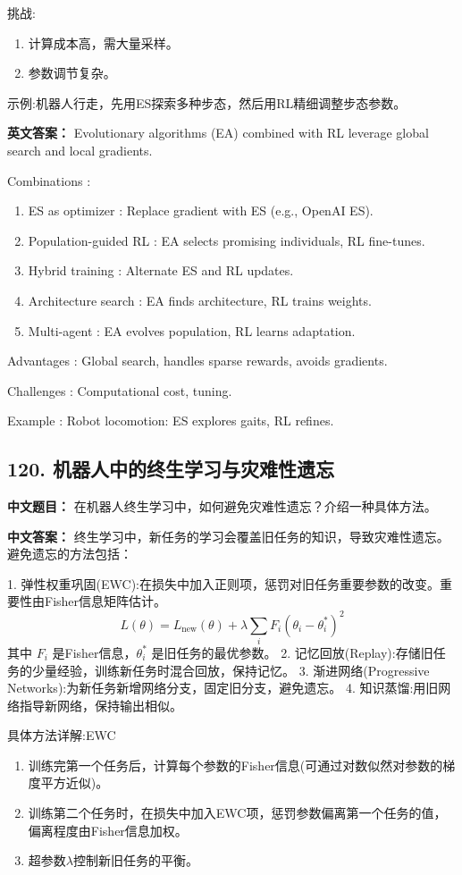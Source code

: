 \documentclass[10pt,a4paper]{ctexart}
\begin{document}
 挑战:
\begin{enumerate}
    \item 计算成本高，需大量采样。
    \item 参数调节复杂。
\end{enumerate}

 示例:机器人行走，先用ES探索多种步态，然后用RL精细调整步态参数。

\textbf{英文答案：}  
Evolutionary algorithms (EA) combined with RL leverage global search and local gradients.

 Combinations :
\begin{enumerate}
    \item ES as optimizer : Replace gradient with ES (e.g., OpenAI ES).
    \item Population-guided RL : EA selects promising individuals, RL fine-tunes.
    \item Hybrid training : Alternate ES and RL updates.
    \item Architecture search : EA finds architecture, RL trains weights.
    \item Multi-agent : EA evolves population, RL learns adaptation.
\end{enumerate}

 Advantages : Global search, handles sparse rewards, avoids gradients.

 Challenges : Computational cost, tuning.

 Example : Robot locomotion: ES explores gaits, RL refines.

\subsection*{120. 机器人中的终生学习与灾难性遗忘}
\textbf{中文题目：} 在机器人终生学习中，如何避免灾难性遗忘？介绍一种具体方法。

\textbf{中文答案：}  
终生学习中，新任务的学习会覆盖旧任务的知识，导致灾难性遗忘。避免遗忘的方法包括：

1.  弹性权重巩固(EWC):在损失中加入正则项，惩罚对旧任务重要参数的改变。重要性由Fisher信息矩阵估计。
   \[
   L(\theta) = L_{\text{new}}(\theta) + \lambda \sum_i F_i (\theta_i - \theta_i^*) ^2
   \]
   其中 \(F_i\) 是Fisher信息，\(\theta_i^*\) 是旧任务的最优参数。
2.  记忆回放(Replay):存储旧任务的少量经验，训练新任务时混合回放，保持记忆。
3.  渐进网络(Progressive Networks):为新任务新增网络分支，固定旧分支，避免遗忘。
4.  知识蒸馏:用旧网络指导新网络，保持输出相似。

 具体方法详解:EWC
\begin{enumerate}
    \item 训练完第一个任务后，计算每个参数的Fisher信息(可通过对数似然对参数的梯度平方近似)。
    \item 训练第二个任务时，在损失中加入EWC项，惩罚参数偏离第一个任务的值，偏离程度由Fisher信息加权。
    \item 超参数\(\lambda\)控制新旧任务的平衡。
\end{enumerate}
\end{document}

